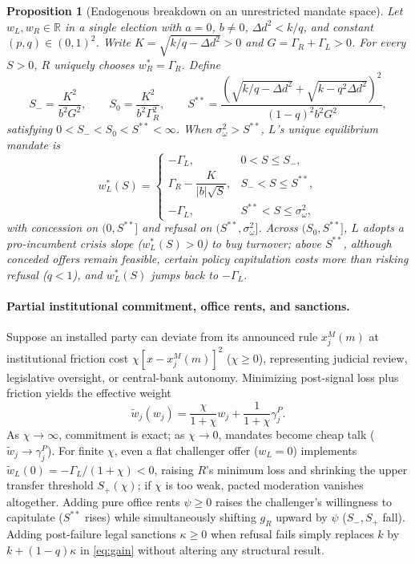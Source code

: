 \documentclass[11pt,letterpaper]{article}
\newtheorem{proposition}{Proposition}
\newcommand{\Dd}{\Delta d}
\begin{document}
\begin{proposition}[Endogenous breakdown on an unrestricted mandate space]\label{prop:unconstrained}
Let $w_L,w_R\in\mathbb R$ in a single election with $a=0$, $b\ne 0$, $\Dd^2<k/q$, and constant $(p,q)\in(0,1)^2$. Write $K=\sqrt{k/q-\Dd^2}>0$ and $G=\Gamma_R+\Gamma_L>0$. For every $S>0$, $R$ uniquely chooses $w_R^*=\Gamma_R$. Define
\[
 S_-=\frac{K^2}{b^2 G^2},\qquad
 S_0=\frac{K^2}{b^2\Gamma_R^2},\qquad
 S^{**}=\frac{\left(\sqrt{k/q-\Dd^2}+\sqrt{k-q^2\Dd^2}\right)^2}{(1-q)^2 b^2 G^2},
\]
satisfying $0<S_-<S_0<S^{**}<\infty$. When $\sigma_\omega^2>S^{**}$, $L$'s unique equilibrium mandate is
\[
 w_L^*(S)=
 \begin{cases}
 -\Gamma_L, & 0<S\le S_-,\\
 \Gamma_R-\dfrac{K}{|b|\sqrt{S}}, & S_-<S\le S^{**},\\
 -\Gamma_L, & S^{**}<S\le\sigma_\omega^2,
 \end{cases}
\]
with concession on $(0,S^{**}]$ and refusal on $(S^{**},\sigma_\omega^2]$. Across $(S_0,S^{**}]$, $L$ adopts a pro-incumbent crisis slope ($w_L^*(S)>0$) to buy turnover; above $S^{**}$, although conceded offers remain feasible, certain policy capitulation costs more than risking refusal ($q<1$), and $w_L^*(S)$ jumps back to $-\Gamma_L$.
\end{proposition}

\paragraph{Partial institutional commitment, office rents, and sanctions.}
Suppose an installed party can deviate from its announced rule $x_j^M(m)$ at institutional friction cost $\chi[x-x_j^M(m)]^2$ ($\chi\ge 0$), representing judicial review, legislative oversight, or central-bank autonomy. Minimizing post-signal loss plus friction yields the effective weight
\begin{equation}
 \tilde w_j(w_j)=\frac{\chi}{1+\chi}w_j+\frac{1}{1+\chi}\gamma_j^P .
 \label{eq:partial}
\end{equation}
As $\chi\to\infty$, commitment is exact; as $\chi\to 0$, mandates become cheap talk ($\tilde w_j\to\gamma_j^P$). For finite $\chi$, even a flat challenger offer ($w_L=0$) implements $\tilde w_L(0)=-\Gamma_L/(1+\chi)<0$, raising $R$'s minimum loss and shrinking the upper transfer threshold $S_+(\chi)$; if $\chi$ is too weak, pacted moderation vanishes altogether. Adding pure office rents $\psi\ge 0$ raises the challenger's willingness to capitulate ($S^{**}$ rises) while simultaneously shifting $g_R$ upward by $\psi$ ($S_-,S_+$ fall). Adding post-failure legal sanctions $\kappa\ge 0$ when refusal fails simply replaces $k$ by $k+(1-q)\kappa$ in \eqref{eq:gain} without altering any structural result.
\end{document}
